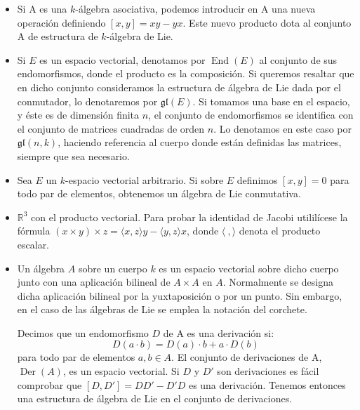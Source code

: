 \documentclass[a4paper,draft,12pt]{scrartcl}
\newcommand{\R}{\mathbb{R}}%
\newcommand{\df}[1]{\textsf{\color{blue}#1}}
\DeclareMathOperator{\End}{End}%
\DeclareMathOperator{\Der}{Der}%
\begin{document}
\newpage


\begin{itemize}

\item Si  A  es una  $k$-álgebra asociativa, podemos introducir en A una nueva operación definiendo $[x,y] = xy - yx$. Este nuevo producto dota al conjunto  A  de estructura de  $k$-álgebra de Lie. 

\item  Si $E$ es un espacio vectorial, denotamos por $\End(E)$ al conjunto de sus endomorfismos, donde el producto es la composición.  Si queremos resaltar que en dicho conjunto consideramos la estructura de álgebra de Lie dada por el conmutador, lo denotaremos por $\mathfrak{gl}(E)$.  Si tomamos una base en el espacio, y éste es de dimensión finita $n$, el conjunto de endomorfismos se identifica con el conjunto de matrices cuadradas de orden $n$.  Lo denotamos en este caso por $\mathfrak{gl}(n,k)$, haciendo referencia al cuerpo donde están definidas las matrices, siempre que sea necesario.

\item Sea $E$ un $k$-espacio vectorial arbitrario.  Si sobre $E$ definimos $[x,y]=0$ para todo par de elementos, obtenemos un álgebra de Lie conmutativa. 


\item $\R^3$ con el   \df{producto vectorial}. Para probar la identidad de Jacobi utililícese la fórmula  $(x \times y) \times z= \langle x,z\rangle y - \langle y,z\rangle x $, donde $\langle \ ,\rangle$ denota el producto escalar.

\item Un álgebra $A$ sobre un cuerpo $k$ es un espacio vectorial sobre dicho cuerpo junto con  una aplicación bilineal de $A \times A $ en $A$.  Normalmente se designa dicha aplicación bilineal por la yuxtaposición o por un punto.  Sin embargo, en el caso de las álgebras de Lie se emplea la notación del corchete.  

 Decimos que un endomorfismo  $D$  de  A  es una   \df{derivación}  si:
\[
D(a\cdot b) = D(a)\cdot b + a\cdot D(b)
\]
para todo par de elementos $a,b \in A$. El conjunto de derivaciones de A, $\Der(A)$, es un espacio vectorial. Si $D$  y  $D'$ son derivaciones es fácil comprobar que $[D,D'] = D D' - D' D$ es una derivación. Tenemos entonces una estructura de álgebra de Lie en el conjunto de derivaciones.



\end{itemize}
\end{document}
